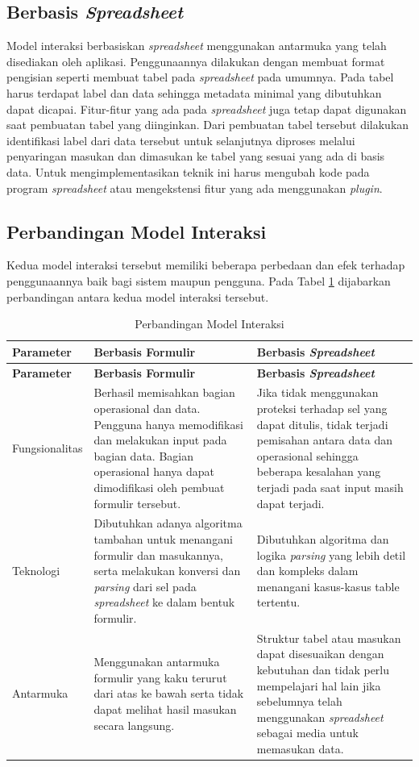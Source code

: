 	\subsection{Berbasis \textit{Spreadsheet}}
	Model interaksi berbasiskan \textit{spreadsheet} menggunakan antarmuka yang telah disediakan oleh aplikasi. Penggunaannya dilakukan dengan membuat format pengisian seperti membuat tabel pada \textit{spreadsheet} pada umumnya. Pada tabel harus terdapat label dan data sehingga metadata minimal yang dibutuhkan dapat dicapai. Fitur-fitur yang ada pada \textit{spreadsheet} juga tetap dapat digunakan saat pembuatan tabel yang diinginkan. Dari pembuatan tabel tersebut dilakukan identifikasi label dari data tersebut untuk selanjutnya diproses melalui penyaringan masukan dan dimasukan ke tabel yang sesuai yang ada di basis data. Untuk mengimplementasikan teknik ini harus mengubah kode pada program \textit{spreadsheet} atau mengekstensi fitur yang ada menggunakan \textit{plugin}. 

	\subsection{Perbandingan Model Interaksi}
	Kedua model interaksi tersebut memiliki beberapa perbedaan dan efek terhadap penggunaannya baik bagi sistem maupun pengguna. Pada Tabel \ref{ModelInteraksi} dijabarkan perbandingan antara kedua model interaksi tersebut.

	\begin{longtable}{ | p{3cm} | p{4cm} | p{4cm} | }
	    \caption{Perbandingan Model Interaksi}
	    \label{ModelInteraksi}\\ \hline
	    \centering\bfseries{Parameter} & \centering\bfseries{Berbasis Formulir} & \centering\bfseries{Berbasis \textit{Spreadsheet}} \tabularnewline \hline
	    \endfirsthead
	    \hline
	    \centering\bfseries{Parameter} & \centering\bfseries{Berbasis Formulir} & \centering\bfseries{Berbasis \textit{Spreadsheet}} \tabularnewline \hline
	    \endhead
	    Fungsionalitas & Berhasil memisahkan bagian operasional dan data. Pengguna hanya memodifikasi dan melakukan input pada bagian data. Bagian operasional hanya dapat dimodifikasi oleh pembuat formulir tersebut. & Jika tidak menggunakan proteksi terhadap sel yang dapat ditulis, tidak terjadi pemisahan antara data dan operasional sehingga beberapa kesalahan yang terjadi pada saat input masih dapat terjadi. \\ \hline
	    Teknologi & Dibutuhkan adanya algoritma tambahan untuk menangani formulir dan masukannya, serta melakukan konversi dan \textit{parsing} dari sel pada \textit{spreadsheet} ke dalam bentuk formulir. & Dibutuhkan algoritma dan logika \textit{parsing} yang lebih detil dan kompleks dalam menangani kasus-kasus table tertentu. \\ \hline
	    Antarmuka & Menggunakan antarmuka formulir yang kaku terurut dari atas ke bawah serta tidak dapat melihat hasil masukan secara langsung. & Struktur tabel atau masukan dapat disesuaikan dengan kebutuhan dan tidak perlu mempelajari hal lain jika sebelumnya telah menggunakan \textit{spreadsheet} sebagai media untuk memasukan data. \\ \hline
  	\end{longtable}

